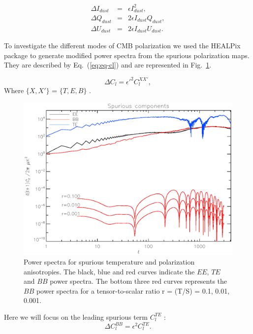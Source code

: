 \begin{eqnarray}
\label{eq:spurious-mapI}
\Delta I_{dust}  &=& \epsilon I_{dust}^{2},\\
\label{eq:spurious-mapQ}
\Delta Q_{dust}  &=& 2\epsilon I_{dust}Q_{dust},\\
\label{eq:spurious-mapU}
\Delta U_{dust} &=& 2 \epsilon I_{dust}U_{dust}.
\end{eqnarray}

To investigate the different modes of CMB polarization we used the HEALPix package \citep{2005ApJ...622..759G} to generate modified power spectra from the spurious polarization maps. They are described by Eq.~(\ref{eq:eq-cl}) and are represented in Fig.~\ref{fig:cl2}.

\begin{equation}
\Delta C_{l} = \epsilon'^{2} C_{l}^{XX'},
\label{eq:eq-cl}
\end{equation}
Where $\lbrace X,X' \rbrace$ = $\lbrace T,E,B \rbrace$ .\\

\begin{figure}[h]
\center
	\includegraphics[clip, angle=0, width=\columnwidth]{Figures/cl2_spurious.eps}
	\caption{Power spectra for spurious temperature and polarization anisotropies. The black, blue and red curves indicate the $EE$, $TE$ and $BB$ power spectra. The bottom three red curves represents the $BB$ power spectra for a tensor-to-scalar ratio r = (T/S) = 0.1, 0.01, 0.001.}
	\label{fig:cl2}
\end{figure}

Here we will focus on the leading spurious term $C_{l}^{TE}$ : 
\begin{equation}
\Delta C_{l}^{BB} = \epsilon^{2} C_{l}^{TE}.
\label{eq:eq-cl2}
\end{equation}


